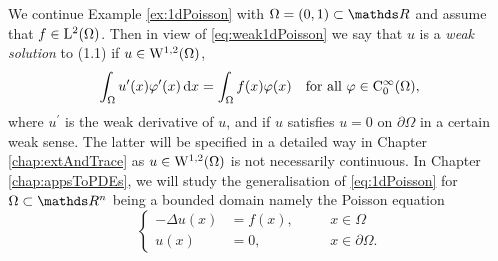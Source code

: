 \begin{ex}
  We continue Example \ref{ex:1dPoisson} with $\Omega = (0,1) \subset \R$ and assume that $f \in \mathrm{L}^2(\Omega)$.
  Then in view of \eqref{eq:weak1dPoisson} we say that $u$ is a \emph{weak solution} to (1.1) if $u \in \mathrm{W}^{1,2}(\Omega)$,
  $$
  \int_\Omega u^\prime(x) \varphi^\prime(x) \, {\operatorname{d}\!{x}} = \int_\Omega f(x) \varphi(x) \quad \text{for all } \varphi \in \mathrm{C}_0^\infty(\Omega),
  $$
  where $u^\prime$ is the weak derivative of $u$, and if $u$ satisfies $u = 0$ on $\partial \Omega$ in a certain weak sense.
  The latter will be specified in a detailed way in Chapter \ref{chap:extAndTrace} as $u \in \mathrm{W}^{1,2}(\Omega)$ is not necessarily continuous.
  In Chapter \ref{chap:appsToPDEs}, we will study the generalisation of \eqref{eq:1dPoisson} for $\Omega \subset \R^n$ being a bounded domain namely the Poisson equation
\begin{equation*}
  \left\{
    \begin{alignedat}{2}
    -\Delta u(x) &= f(x), &&\quad x \in \Omega \\
    u(x) &= 0, &&\quad x \in \partial\Omega.
    \end{alignedat}
    \right.
\end{equation*}
\end{ex}

